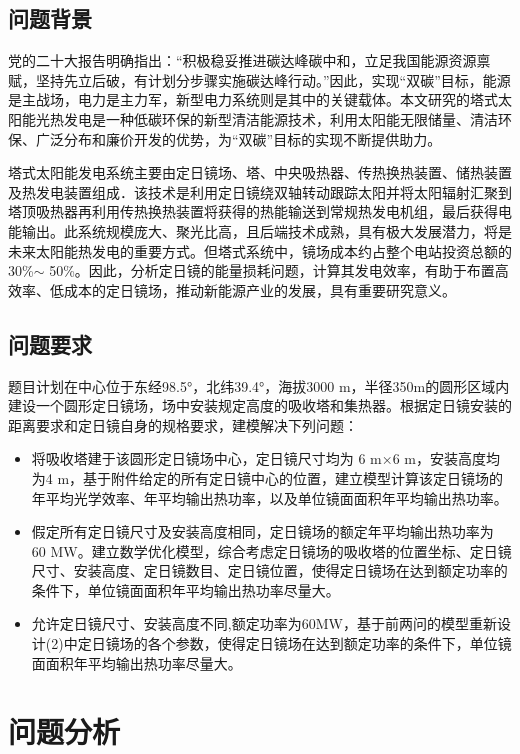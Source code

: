 \documentclass[withoutpreface,bwprint]{cumcmthesis}
\begin{document}
\subsection{问题背景}
党的二十大报告明确指出：“积极稳妥推进碳达峰碳中和，立足我国能源资源禀赋，坚持先立后破，有计划分步骤实施碳达峰行动。”因此，实现“双碳”目标，能源是主战场，电力是主力军，新型电力系统则是其中的关键载体。本文研究的塔式太阳能光热发电是一种低碳环保的新型清洁能源技术，利用太阳能无限储量、清洁环保、广泛分布和廉价开发的优势，为“双碳”目标的实现不断提供助力。

塔式太阳能发电系统主要由定日镜场、塔、中央吸热器、传热换热装置、储热装置及热发电装置组成．该技术是利用定日镜绕双轴转动跟踪太阳并将太阳辐射汇聚到塔顶吸热器再利用传热换热装置将获得的热能输送到常规热发电机组，最后获得电能输出。此系统规模庞大、聚光比高，且后端技术成熟，具有极大发展潜力，将是未来太阳能热发电的重要方式。但塔式系统中，镜场成本约占整个电站投资总额的30\%$\sim$ 50\%。因此，分析定日镜的能量损耗问题，计算其发电效率，有助于布置高效率、低成本的定日镜场，推动新能源产业的发展，具有重要研究意义。

\subsection{问题要求}
题目计划在中心位于东经98.5°，北纬39.4°，海拔3000 m，半径350m的圆形区域内建设一个圆形定日镜场，场中安装规定高度的吸收塔和集热器。根据定日镜安装的距离要求和定日镜自身的规格要求，建模解决下列问题：

\begin{itemize}
	\item [(1)] 
	将吸收塔建于该圆形定日镜场中心，定日镜尺寸均为 6 m×6 m，安装高度均为4 m，基于附件给定的所有定日镜中心的位置，建立模型计算该定日镜场的年平均光学效率、年平均输出热功率，以及单位镜面面积年平均输出热功率。
	\item [(2)]
	假定所有定日镜尺寸及安装高度相同，定日镜场的额定年平均输出热功率为 60 MW。建立数学优化模型，综合考虑定日镜场的吸收塔的位置坐标、定日镜尺寸、安装高度、定日镜数目、定日镜位置，使得定日镜场在达到额定功率的条件下，单位镜面面积年平均输出热功率尽量大。
	\item [(3)]
	允许定日镜尺寸、安装高度不同,额定功率为60MW，基于前两问的模型重新设计(2)中定日镜场的各个参数，使得定日镜场在达到额定功率的条件下，单位镜面面积年平均输出热功率尽量大。
\end{itemize}        

\section{问题分析}
\end{document}
